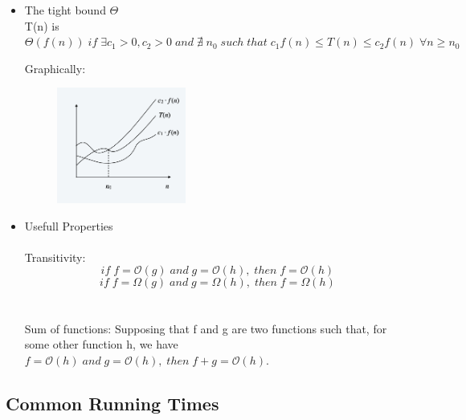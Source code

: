 \documentclass[11pt]{article}
\begin{document}
\begin{itemize}
\item The tight bound $\Theta$ \\
T(n) is $ \Theta(f(n)) \; if \; \exists c_{1} > 0, c_{2}>0 \; and \; \nexists \;n_{0} \; such \; that \; c_{1}f(n) \leq T(n) \leq c_{2} f(n) \; \forall n \geq n_{0}$

Graphically:

\begin{figure}[H]
		\centering
		\includegraphics[width=0.4\textwidth ]{tight}
\end{figure}

\item {Usefull Properties}\\\\
Transitivity:
\[ if \; f = \mathcal{O}{(g)} \; and \; g =\mathcal{O}{(h)}, \; then \;f = \mathcal{O}{(h)}\]
\[ if \; f = \Omega{(g)} \; and \; g =\Omega{(h)}, \; then \;f = \Omega{(h)}\]\\\\
Sum of functions:
Supposing that f and g are two functions such that, for some other function h, we have $f = \mathcal{O}{(h)} \; and \;g = \mathcal{O}{(h)}, \; then \; f + g = \mathcal{O}{(h)}.$

\end{itemize}

\subsection{Common Running Times}
\end{document}
